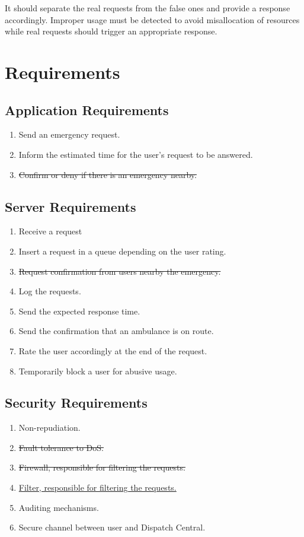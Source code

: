 \documentclass[a4paper,titlepage,11pt]{article}
\begin{document}
It should separate the real requests from the false ones and provide a response accordingly.
Improper usage must be detected to avoid misallocation of resources while real requests should
trigger an appropriate response.

\section{Requirements}

\subsection{Application Requirements}
\begin{enumerate}
  \item Send an emergency request.
  \item Inform the estimated time for the user's request to be answered.
  \item \st{Confirm or deny if there is an emergency nearby.}
\end{enumerate}

\subsection{Server Requirements}
\begin{enumerate}
  \item Receive a request
  \item Insert a request in a queue depending on the user rating.
  \item \st{Request confirmation from users nearby the emergency.}
  \item Log the requests.
  \item Send the expected response time.
  \item Send the confirmation that an ambulance is on route.
  \item Rate the user accordingly at the end of the request.
  \item Temporarily block a user for abusive usage.
\end{enumerate}

\subsection{Security Requirements}
\begin{enumerate}
  \item Non-repudiation.
  \item \st{Fault tolerance to DoS.}
  \item \st{Firewall, responsible for filtering the requests.}
  \item \underline{Filter, responsible for filtering the requests.}
  \item Auditing mechanisms.
  \item Secure channel between user and Dispatch Central.
\end{enumerate}
\end{document}
